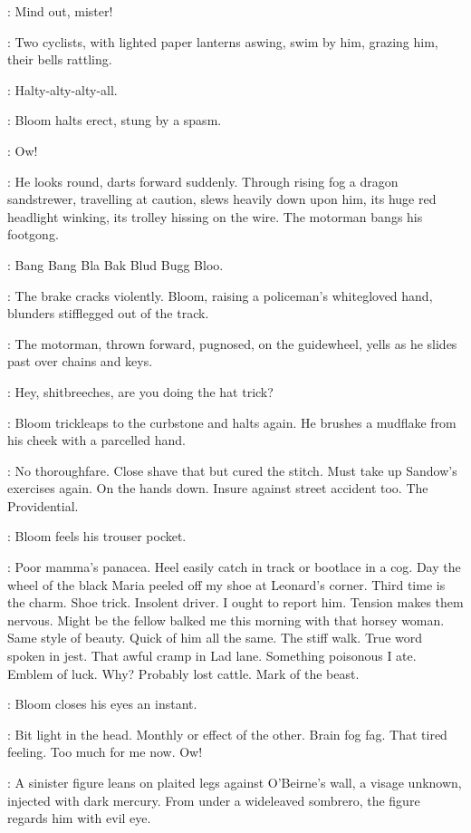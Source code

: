\Urchins:
Mind out, mister!

:
Two cyclists, with lighted paper lanterns aswing,
swim by him, grazing him, their bells rattling.

\Bells:
Halty-alty-alty-all.

:
Bloom halts erect, stung by a spasm.

\Bloom:
Ow!

:
He looks round, darts forward suddenly.
Through rising fog a dragon sandstrewer, travelling at caution,
slews heavily down upon him, its huge red headlight winking,
its trolley hissing on the wire.
The motorman bangs his footgong.

\Gong:
Bang Bang Bla Bak Blud Bugg Bloo.

:
The brake cracks violently.
Bloom, raising a policeman's whitegloved hand,
blunders stifflegged out of the track.

:
The motorman, thrown forward, pugnosed, on the guidewheel,
yells as he slides past over chains and keys.

\Motorman:
Hey, shitbreeches, are you doing the hat trick?

:
Bloom trickleaps to the curbstone and halts again.
He brushes a mudflake from his cheek with a parcelled hand.

\Bloom:
No thoroughfare.
Close shave that but cured the stitch.
Must take up Sandow's exercises again.
On the hands down.
Insure against street accident too.
The Providential.

:
Bloom feels his trouser pocket.

\Bloom:
Poor mamma's panacea.
Heel easily catch in track or bootlace in a cog.
Day the wheel of the black Maria peeled off my shoe at Leonard's corner.
Third time is the charm.
Shoe trick.
Insolent driver.
I ought to report him.
Tension makes them nervous.
Might be the fellow balked me this morning with that horsey woman.
Same style of beauty.
Quick of him all the same.
The stiff walk.
True word spoken in jest.
That awful cramp in Lad lane.
Something poisonous I ate.
Emblem of luck.
Why? Probably lost cattle.
Mark of the beast.

:
Bloom closes his eyes an instant.

\Bloom:
Bit light in the head.
Monthly or effect of the other.
Brain fog fag.
That tired feeling.
Too much for me now.
Ow!

:
A sinister figure leans on plaited legs against O'Beirne's wall,
a visage unknown, injected with dark mercury.
From under a wideleaved sombrero, the figure regards him with evil eye.

